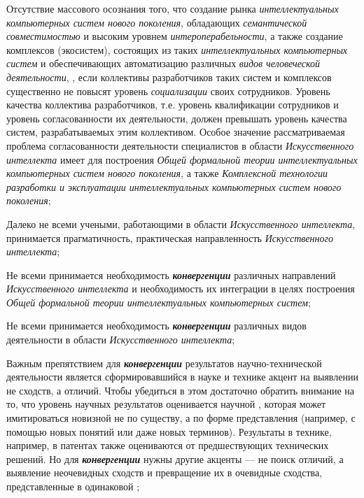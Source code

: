 \begin{textitemize}
	\item
	Отсутствие массового осознания того, что создание рынка \textit{интеллектуальных компьютерных систем нового поколения}, обладающих \textit{семантической совместимостью} и высоким уровнем \textit{интероперабельности}, а также создание комплексов (экосистем), состоящих из таких \textit{интеллектуальных компьютерных систем} и обеспечивающих автоматизацию различных \textit{видов человеческой деятельности}, , если коллективы разработчиков таких систем и комплексов существенно не повысят уровень \textit{социализации} \textbf{} своих сотрудников. Уровень качества коллектива разработчиков, т.е. уровень квалификации сотрудников и уровень согласованности их деятельности, должен превышать уровень качества систем, разрабатываемых этим коллективом. Особое значение рассматриваемая проблема согласованности деятельности специалистов в области \textit{Искусственного интеллекта} имеет для построения \textit{Общей формальной теории интеллектуальных компьютерных систем нового поколения}, а также \textit{Комплексной технологии разработки и эксплуатации интеллектуальных компьютерных систем нового поколения};
	\item
	Далеко не всеми учеными, работающими в области \textit{Искусственного интеллекта}, принимается прагматичность, практическая направленность \textit{Искусственного интеллекта};
	\item
	Не всеми принимается необходимость \textbf{\textit{конвергенции}} различных направлений \textit{Искусственного интеллекта} и необходимость их интеграции в целях построения \textit{Общей формальной теории интеллектуальных компьютерных систем};
	\item
	Не всеми принимается необходимость \textbf{\textit{конвергенции}} различных видов деятельности в области \textit{Искусственного интеллекта};
	\item
	Важным препятствием для \textbf{\textit{конвергенции}} результатов научно-технической деятельности является сформировавшийся в науке и технике акцент на выявлении не сходств, а отличий. Чтобы убедиться в этом достаточно обратить внимание на то, что уровень научных результатов оценивается научной , которая может имитироваться новизной не по существу, а по форме представления (например, с помощью новых понятий или даже новых терминов). Результаты в технике, например, в патентах также оцениваются  от предшествующих технических решений. Но для \textbf{\textit{конвергенции}} нужны другие акценты --- не поиск отличий, а выявление неочевидных сходств и превращение их в очевидные сходства, представленные в одинаковой ;

\end{textitemize}
